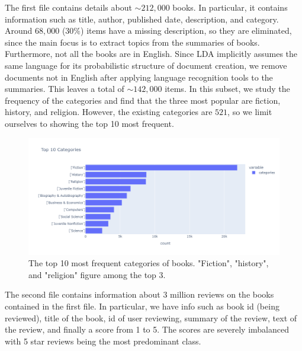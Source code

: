 \documentclass[a4paper,10pt, openright]{article}
\begin{document}
The first file contains details about $\sim 212,000$ books. In particular, it contains information such as title, author, published date, description, and category. Around $68,000$ ($30\%$) items have a missing description, so they are eliminated, since the main focus is to extract topics from the summaries of books. Furthermore, not all the books are in English. Since LDA implicitly assumes the same language for its probabilistic structure of document creation, we remove documents not in English after applying language recognition tools to the summaries. This leaves a total of $\sim 142,000$ items. In this subset, we study the frequency of the categories and find that the three most popular are fiction, history, and religion. However, the existing categories are $521$, so we limit ourselves to showing the top 10 most frequent.

\begin{figure}[H]
	\begin{center}
		\includegraphics[width=20 cm, height=10 cm]{./Images/categories.png}
		\caption{The top 10 most frequent categories of books. "Fiction", "history", and "religion" figure among the top 3.}
		\label{fig:categories}
	\end{center}
\end{figure}
\newpage
The second file contains information about $3$ million reviews on the books contained in the first file. In particular, we have info such as book id (being reviewed), title of the book, id of user reviewing, summary of the review, text of the review, and finally a score from 1 to 5. The scores are severely imbalanced with 5 star reviews being the most predominant class.
\end{document}
